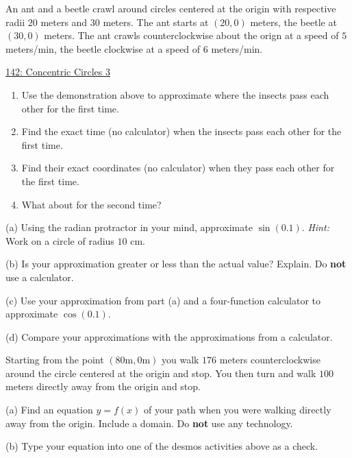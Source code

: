 \documentclass{ximera}
\begin{document}
\begin{question} \label{Q9er9fggdftgre}
An ant and a beetle crawl around circles centered at the origin with respective radii $20$ meters and $30$ meters.  The ant starts at $(20,0)$ meters, the beetle at $(30,0)$ meters. The ant crawls counterclockwise about the orign at a speed of $5$ meters/min, the beetle clockwise at a speed of $6$ meters/min. 

\begin{onlineOnly}
    \begin{center}
\end{center}
\end{onlineOnly}

\href{https://www.desmos.com/calculator/4muppiwdb2}{142: Concentric Circles 3}

\begin{enumerate}
\item Use the demonstration above to approximate where the insects pass each other for the first time.

\item Find the exact time (no calculator) when the insects pass each other for the first time.

\item Find their exact coordinates (no calculator) when they pass each other for the first time.

\item What about for the second time?
\end{enumerate}
 
\end{question}





\begin{question}  \label{Qfgarg:Cosine}
(a) Using the radian protractor in your mind, approximate $\sin (0.1)$. {\it Hint:} Work on a circle of radius $10$ cm.

(b) Is your approximation greater or less than the actual value? Explain. Do {\bf not} use a calculator.

(c) Use your approximation from part (a) and a four-function calculator to approximate $\cos(0.1)$. 

(d) Compare your approximations with the approximations from a calculator.

\end{question}



\begin{question}  \label{dsfb4t5r:Cosine}
Starting from the point $(80 \text{m},0 \text{m})$ you walk $176$ meters counterclockwise around the circle centered at the origin and stop. You then turn and walk $100$ meters directly away from the origin and stop.

(a) Find an equation $y=f(x)$ of your path when you were walking directly away from the origin. Include a domain. Do {\bf not} use any technology.

(b) Type your equation into one of the desmos activities above as a check.

\end{question}
\end{document}
